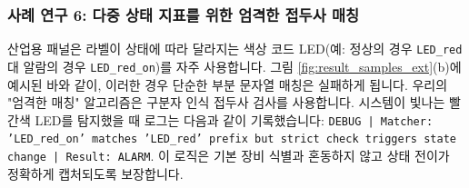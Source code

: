 \subsubsection{사례 연구 6: 다중 상태 지표를 위한 엄격한 접두사 매칭}
산업용 패널은 라벨이 상태에 따라 달라지는 색상 코드 LED(예: 정상의 경우 \texttt{LED_red} 대 알람의 경우 \texttt{LED_red_on})를 자주 사용합니다.
그림 \ref{fig:result_samples_ext}(b)에 예시된 바와 같이, 이러한 경우 단순한 부분 문자열 매칭은 실패하게 됩니다.
우리의 "엄격한 매칭" 알고리즘은 구분자 인식 접두사 검사를 사용합니다.
시스템이 빛나는 빨간색 LED를 탐지했을 때 로그는 다음과 같이 기록했습니다: \texttt{DEBUG | Matcher: 'LED_red_on' matches 'LED_red' prefix but strict check triggers state change | Result: ALARM}.
이 로직은 기본 장비 식별과 혼동하지 않고 상태 전이가 정확하게 캡처되도록 보장합니다.

